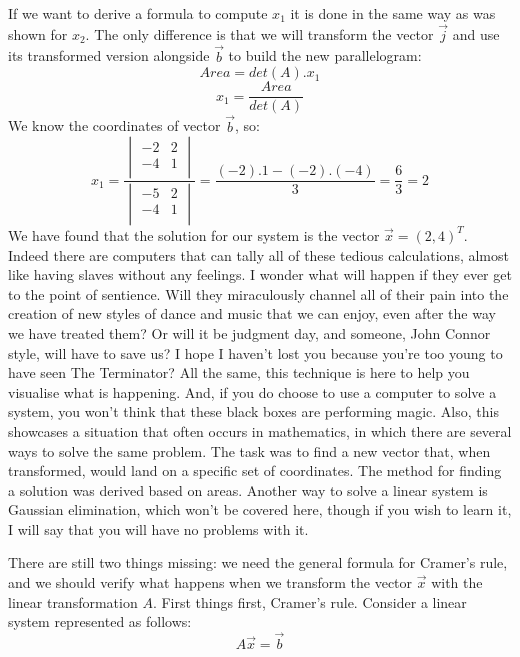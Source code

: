 \documentclass[600paper, 11pt,twoside,openany]{kdp}
\begin{document}
\indent If we want to derive a formula to compute $x_1$ it is done in the same way as was shown for $x_2$. The only difference is that we will transform the vector $\overrightarrow{j}$ and use its transformed version alongside $\overrightarrow{b}$ to build the new parallelogram:
\[Area =det(A).x_1\]
\[x_1 = \frac{Area}{det(A)}\]
\indent We know the coordinates of vector $\overrightarrow{b}$, so:
\[x_1 = \frac{\begin{vmatrix}
 -2 & 2 \\
  -4 & 1\\
\end{vmatrix} }{\begin{vmatrix}
-5 & 2  \\
-4 & 1 \\
\end{vmatrix}} = \frac{(-2).1 - (-2).(-4)}{3} = \frac{6}{3} = 2 \]
\indent We have found that the solution for our system is the vector $\overrightarrow{x} = (2,4)^T$. Indeed there are computers that can tally all of these tedious calculations, almost like having slaves without any feelings. I wonder what will happen if they ever get to the point of sentience. Will they miraculously channel all of their pain into the creation of new styles of dance and music that we can enjoy, even after the way we have treated them? Or will it be judgment day, and someone, John Connor style, will have to save us? I hope I haven’t lost you because you’re too young to have seen The Terminator? All the same, this technique is here to help you visualise what is happening. And, if you do choose to use a computer to solve a system, you won’t think that these black boxes are performing magic. Also, this showcases a situation that often occurs in mathematics, in which there are several ways to solve the same problem. The task was to find a new vector that, when transformed, would land on a specific set of coordinates. The method for finding a solution was derived based on areas. Another way to solve a linear system is Gaussian elimination, which won’t be covered here, though if you wish to learn it, I will say that you will have no problems with it.  
\par 
\vspace{-3pt}
\indent There are still two things missing: we need the general formula for Cramer’s rule, and we should verify what happens when we transform the vector $\overrightarrow{x}$ with the linear transformation $A$. First things first, Cramer’s rule. Consider a linear system represented as follows:
\[A\overrightarrow{x} = \overrightarrow{b} \]
\end{document}
